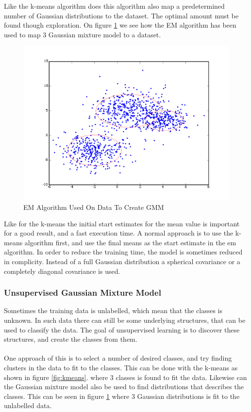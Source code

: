 Like the k-means algorithm does this algorithm also map a predetermined number of Gaussian distributions to the dataset. The optimal amount must be found though exploration. On figure \ref{fig:UGMM} we see how the EM algorithm has been used to map 3 Gaussian mixture model to a dataset. 

\begin{figure}[H]
\centering
\includegraphics[scale=0.5]{billeder/UGMM}
\caption{EM Algorithm Used On Data To Create GMM}
\label{fig:UGMM}
\end{figure}

Like for the k-means the initial start estimates for the mean value is important for a good result, and a fast execution time. A normal approach is to use the k-means algorithm first, and use the final means as the start estimate in the em algorithm. In order to reduce the training time, the model is sometimes reduced in complicity. Instead of a full Gaussian distribution a spherical covariance or a completely diagonal covariance is used. 

\subsubsection{Unsupervised Gaussian Mixture Model}
\label{sec:UGMM}
Sometimes the training data is unlabelled, which mean that the classes is unknown. In such data there can still be some underlying structures, that can be used to classify the data. The goal of unsupervised learning is to discover these structures, and create the classes from them. \\ \ \\
One approach of this is to select a number of desired classes, and try finding clusters in the data to fit to the classes. This can be done with the k-means as shown in figure \ref{fig:kmeans}.  where 3 classes is found to fit the data. Likewise can the Gaussian mixture model also be used to find distributions that describes the classes. This can be seen in figure \ref{fig:UGMM} where 3 Gaussian distributions is fit to the unlabelled data. \\ \ \\

